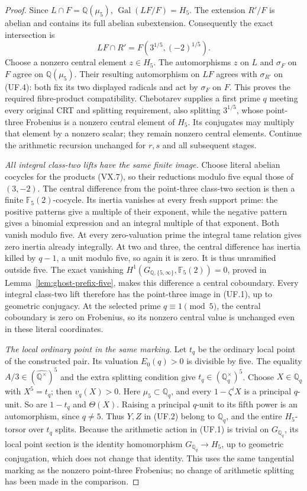 \begin{proof}
Since \(L\cap F=\mathbb Q(\mu_5)\),
\(\operatorname{Gal}(LF/F)=H_5\).
The extension \(R'/F\) is abelian and
contains its full abelian subextension.
Consequently the exact intersection is
\[
 LF\cap R'=F(3^{1/5},(-2)^{1/5}).
 \tag{UF.4}
\]
Choose a nonzero central element \(z\in H_5\).
The automorphisms \(z\) on \(L\) and
\(\sigma_F\) on \(F\) agree on
\(\mathbb Q(\mu_5)\). Their resulting
automorphism on \(LF\) agrees with
\(\sigma_{R'}\) on (UF.4): both fix its
two displayed radicals and act by
\(\sigma_F\) on \(F\).
This proves the required fibre-product
compatibility. Chebotarev supplies a
first prime \(q\) meeting every original
CRT and splitting requirement, also
splitting \(3^{1/5}\), whose point-three
Frobenius is a nonzero central element
of \(H_5\). Its conjugates may multiply
that element by a nonzero scalar; they
remain nonzero central elements. Continue
the arithmetic recursion unchanged for
\(r,s\) and all subsequent stages.

\emph{All integral class-two lifts have the same finite image.}
Choose literal abelian cocycles for the
products (VX.7), so their reductions modulo
five equal those of \((3,-2)\). The
central difference from the point-three
class-two section is then a finite
\(\mathbb F_5(2)\)-cocycle. Its inertia
vanishes at every fresh support prime:
the positive patterns give a multiple
of their exponent, while the negative
pattern gives a binomial expression
and an integral multiple of that
exponent. Both vanish modulo five.
At every zero-valuation prime the
integral tame relation gives zero
inertia already integrally. At two
and three, the central difference has
inertia killed by \(q-1\), a unit
modulo five, so again it is zero.
It is thus unramified outside five.
The exact vanishing
\(H^1(G_{\mathbb Q,\{5,\infty\}},
       \mathbb F_5(2))=0\), proved in
Lemma~\ref{lem:ghost-prefix-five},
makes this difference a central
coboundary. Every integral class-two
lift therefore has the point-three
image in (UF.1), up to geometric
conjugacy. At the selected prime
\(q\equiv1\pmod5\), the central
coboundary is zero on Frobenius,
so its nonzero central value is
unchanged even in these literal
coordinates.

\emph{The local ordinary point in the same marking.}
Let \(t_q\) be the ordinary local point
of the constructed pair. Its valuation
\(E_0(q)>0\) is divisible by five.
The equality \(A/3\in(\widehat{\mathbb Q^\times})^5\)
and the extra splitting condition give
\(t_q\in(\mathbb Q_q^\times)^5\).
Choose \(X\in\mathbb Q_q\) with
\(X^5=t_q\); then \(v_q(X)>0\).
Here \(\mu_5\subset\mathbb Q_q\), and
every \(1-\zeta^iX\) is a principal
\(q\)-unit. So are \(1-t_q\) and
\(\Theta(X)\). Raising a principal
\(q\)-unit to its fifth power is an
automorphism, since \(q\ne5\).
Thus \(Y,Z\) in (UF.2) belong to
\(\mathbb Q_q\), and the entire
\(H_5\)-torsor over \(t_q\) splits.
Because the arithmetic action in
(UF.1) is trivial on \(G_{\mathbb Q_q}\),
its local point section is the identity
homomorphism \(G_{\mathbb Q_q}\to H_5\),
up to geometric conjugation, which
does not change that identity. This
uses the same tangential marking as
the nonzero point-three Frobenius;
no change of arithmetic splitting
has been made in the comparison.


\end{proof}
